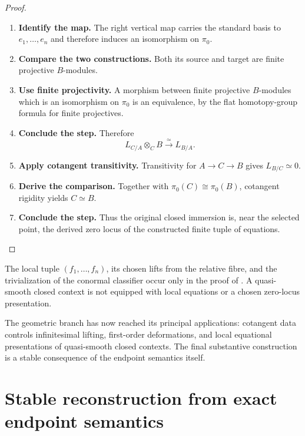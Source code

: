 \begin{proof}
\begin{enumerate}[label=\textup{(\arabic*)}]
    \item \textbf{Identify the map.}
    The right vertical map carries the standard basis to \(e_1,\ldots,e_n\) and therefore induces an
    isomorphism on \(\pi_0\).

    \item \textbf{Compare the two constructions.}
    Both its source and target are finite projective \(B\)-modules.

    \item \textbf{Use finite projectivity.}
    A morphism between finite projective \(B\)-modules which is an isomorphism on
    \(\pi_0\) is an equivalence, by the flat homotopy-group formula for finite projectives.

    \item \textbf{Conclude the step.}
    Therefore
    \[
            L_{C/A}\otimes_CB
            \xrightarrow{\simeq}
            L_{B/A}.
        \]

    \item \textbf{Apply cotangent transitivity.}
    Transitivity for \(A\to C\to B\) gives \(L_{B/C}\simeq0\).

    \item \textbf{Derive the comparison.}
    Together with \(\pi_0(C)\cong\pi_0(B)\), cotangent rigidity yields \(C\simeq B\).

    \item \textbf{Conclude the step.}
    Thus the original closed immersion is, near the selected point, the derived zero locus of
    the constructed finite tuple of equations.
\end{enumerate}
\end{proof}

\begin{remark}
\label{rem:zero-locus-presentation-witness}
The local tuple \((f_1,\ldots,f_n)\), its chosen lifts from the relative fibre,
and the trivialization of the conormal classifier occur only in the proof of
. A quasi-smooth closed context is
not equipped with local equations or a chosen zero-locus presentation.
\end{remark}
The geometric branch has now reached its principal applications: cotangent
data controls infinitesimal lifting, first-order deformations, and local
equational presentations of quasi-smooth closed contexts. The final
substantive construction is a stable consequence of the endpoint semantics
itself.

\section{Stable reconstruction from exact endpoint semantics}
\label{sec:stable-bnv-differential-cohomology}

